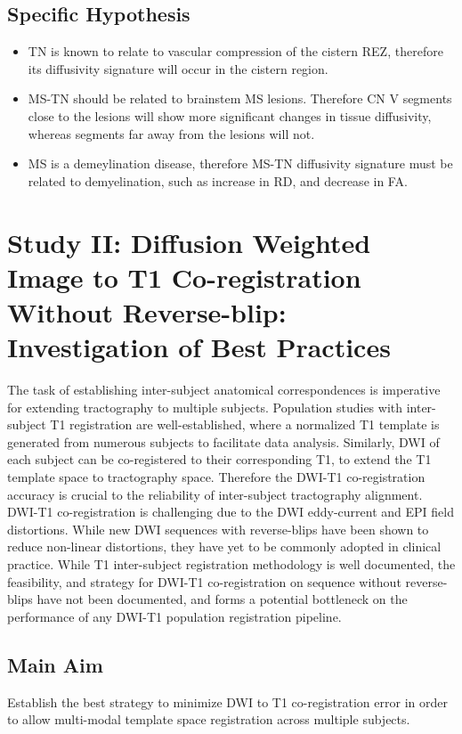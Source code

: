 \subsection{Specific Hypothesis}
\begin{itemize}
    \item TN is known to relate to vascular compression of the cistern REZ, therefore its diffusivity signature will occur in the cistern region.
    \item MS-TN should be related to brainstem MS lesions. Therefore CN V segments close to the lesions will show more significant changes in tissue diffusivity, whereas segments far away from the lesions will not. 
    \item MS is a demeylination disease, therefore MS-TN diffusivity signature must be related to demyelination, such as increase in RD, and decrease in FA. 
\end{itemize}

\section{Study II: Diffusion Weighted Image to T1 Co-registration Without Reverse-blip: Investigation of Best Practices}
The task of establishing inter-subject anatomical correspondences is imperative for extending tractography to multiple subjects. Population studies with inter-subject T1 registration are well-established, where a normalized T1 template is generated from numerous subjects to facilitate data analysis. Similarly, DWI of each subject can be co-registered to their corresponding T1, to extend the T1 template space to tractography space. Therefore the DWI-T1 co-registration accuracy is crucial to the reliability of inter-subject tractography alignment. DWI-T1 co-registration is challenging due to the DWI eddy-current and EPI field distortions. While new DWI sequences with reverse-blips have been shown to reduce non-linear distortions, they have yet to be commonly adopted in clinical practice. While T1 inter-subject registration methodology is well documented, the feasibility, and strategy for DWI-T1 co-registration on sequence without reverse-blips have not been documented, and forms a potential bottleneck on the performance of any DWI-T1 population registration pipeline.

\subsection{Main Aim}
Establish the best strategy to minimize DWI to T1 co-registration error in order to allow multi-modal template space registration across multiple subjects.

